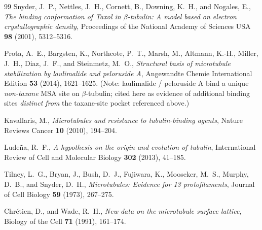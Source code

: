 \documentclass[12pt]{article}
\begin{document}
\begin{thebibliography}{99}
Snyder, J.~P., Nettles, J.~H., Cornett, B., Downing, K.~H., and
Nogales, E.,
\emph{The binding conformation of Taxol in $\beta$-tubulin: A
model based on electron crystallographic density},
Proceedings of the National Academy of Sciences USA
\textbf{98} (2001), 5312--5316.

Prota, A.~E., Bargsten, K., Northcote, P.~T., Marsh, M.,
Altmann, K.-H., Miller, J.~H., Diaz, J.~F., and Steinmetz, M.~O.,
\emph{Structural basis of microtubule stabilization by laulimalide
and peloruside A},
Angewandte Chemie International Edition \textbf{53} (2014),
1621--1625.
(Note: laulimalide / peloruside A bind a unique \emph{non-taxane}
MSA site on $\beta$-tubulin; cited here as evidence of
additional binding sites \emph{distinct from} the taxane-site
pocket referenced above.)

Kavallaris, M.,
\emph{Microtubules and resistance to tubulin-binding agents},
Nature Reviews Cancer \textbf{10} (2010), 194--204.

Lude\~na, R.~F.,
\emph{A hypothesis on the origin and evolution of tubulin},
International Review of Cell and Molecular Biology \textbf{302}
(2013), 41--185.

Tilney, L.~G., Bryan, J., Bush, D.~J., Fujiwara, K.,
Mooseker, M.~S., Murphy, D.~B., and Snyder, D.~H.,
\emph{Microtubules: Evidence for 13 protofilaments},
Journal of Cell Biology \textbf{59} (1973), 267--275.

Chr\'etien, D., and Wade, R.~H.,
\emph{New data on the microtubule surface lattice},
Biology of the Cell \textbf{71} (1991), 161--174.

\end{thebibliography}
\end{document}
